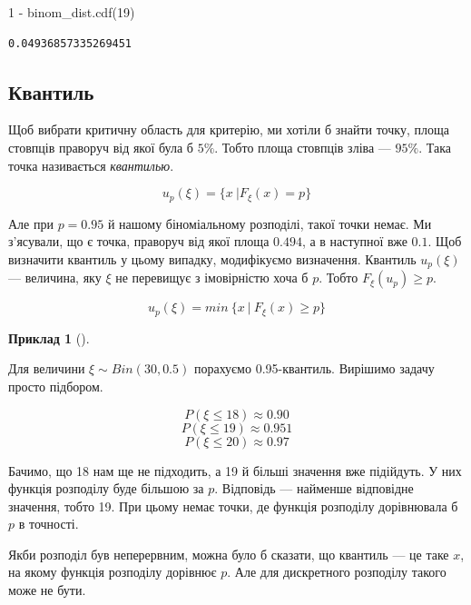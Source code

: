 \documentclass[
  letterpaper,
  10pt,
  openany]{report}
\newenvironment{Shaded}{\begin{snugshade}}{\end{snugshade}}
\newcommand{\DecValTok}[1]{\textcolor[rgb]{0.68,0.00,0.00}{#1}}
\newcommand{\NormalTok}[1]{\textcolor[rgb]{0.00,0.23,0.31}{#1}}
\newcommand{\OperatorTok}[1]{\textcolor[rgb]{0.37,0.37,0.37}{#1}}
\theoremstyle{definition}
\newtheorem{example}{Приклад}[chapter]
\theoremstyle{remark}
\begin{document}
\begin{Shaded}
\begin{Highlighting}[]
\DecValTok{1} \OperatorTok{{-}}\NormalTok{ binom\_dist.cdf(}\DecValTok{19}\NormalTok{)}
\end{Highlighting}
\end{Shaded}

\begin{verbatim}
0.04936857335269451
\end{verbatim}

\subsection{Квантиль}\label{ux43aux432ux430ux43dux442ux438ux43bux44c}

Щоб вибрати критичну область для критерію, ми хотіли б знайти точку,
площа стовпців праворуч від якої була б \(5\%\). Тобто площа стовпців
зліва --- \(95\%\). Така точка називається \emph{квантилью}.

\[
u_p(\xi) = \{x\ | F_\xi(x) = p\}
\]

Але при \(p = 0.95\) й нашому біноміальному розподілі, такої точки
немає. Ми з'ясували, що є точка, праворуч від якої площа \(0.494\), а в
наступної вже \(0.1\). Щоб визначити квантиль у цьому випадку,
модифікуємо визначення. Квантиль \(u_p(\xi)\) --- величина, яку \(\xi\)
не перевищує з імовірністю хоча б \(p\). Тобто
\(F_\xi(u_p) \geqslant p\).

\[
u_p(\xi) = min\ \{x\ |\ F_\xi(x) \geqslant p \}
\]

\begin{example}[]\protect\hypertarget{exm-quantile}{}\label{exm-quantile}

Для величини \(\xi \sim Bin(30, 0.5)\) порахуємо 0.95-квантиль. Вирішимо
задачу просто підбором.

\[ P(\xi \leqslant 18) \approx 0.90\]
\[ P(\xi \leqslant 19) \approx 0.951 \]
\[ P(\xi \leqslant 20) \approx 0.97 \]

Бачимо, що 18 нам ще не підходить, а 19 й більші значення вже підійдуть.
У них функція розподілу буде більшою за \(p\). Відповідь --- найменше
відповідне значення, тобто 19. При цьому немає точки, де функція
розподілу дорівнювала б \(p\) в точності.

Якби розподіл був неперервним, можна було б сказати, що квантиль --- це
таке \(x\), на якому функція розподілу дорівнює \(p\). Але для
дискретного розподілу такого може не бути.

\end{example}
\end{document}
